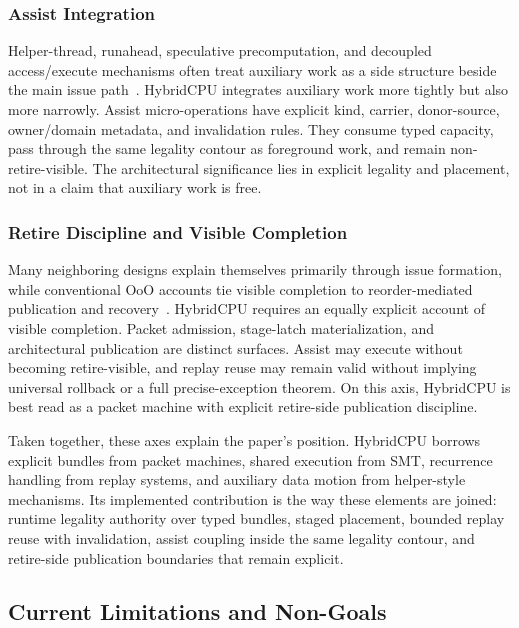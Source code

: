 \documentclass[twocolumn]{article}
\begin{document}
\subsubsection{Assist Integration}

Helper-thread, runahead, speculative precomputation, and decoupled access/execute mechanisms often treat auxiliary work as a side structure beside the main issue path~\cite{mutlu2003runahead,collins2001speculative,chappell1999ssmt,smith1984decoupled}. HybridCPU integrates auxiliary work more tightly but also more narrowly. Assist micro-operations have explicit kind, carrier, donor-source, owner/domain metadata, and invalidation rules. They consume typed capacity, pass through the same legality contour as foreground work, and remain non-retire-visible. The architectural significance lies in explicit legality and placement, not in a claim that auxiliary work is free.


\subsubsection{Retire Discipline and Visible Completion}

Many neighboring designs explain themselves primarily through issue formation, while conventional OoO accounts tie visible completion to reorder-mediated publication and recovery~\cite{tomasulo1967efficient,palacharla1997complexity,smith1995microarchitecture}. HybridCPU requires an equally explicit account of visible completion. Packet admission, stage-latch materialization, and architectural publication are distinct surfaces. Assist may execute without becoming retire-visible, and replay reuse may remain valid without implying universal rollback or a full precise-exception theorem. On this axis, HybridCPU is best read as a packet machine with explicit retire-side publication discipline.

Taken together, these axes explain the paper's position. HybridCPU borrows explicit bundles from packet machines, shared execution from SMT, recurrence handling from replay systems, and auxiliary data motion from helper-style mechanisms. Its implemented contribution is the way these elements are joined: runtime legality authority over typed bundles, staged placement, bounded replay reuse with invalidation, assist coupling inside the same legality contour, and retire-side publication boundaries that remain explicit.


\subsection{Current Limitations and Non-Goals}
\end{document}
